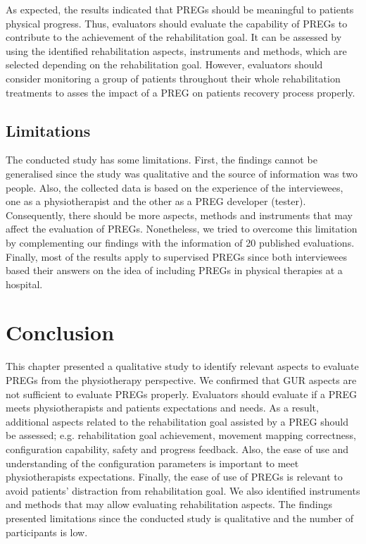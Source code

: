 As expected, the results indicated that \acp{PREG} should be meaningful to patients physical progress. Thus, evaluators should evaluate the capability of \acp{PREG} to contribute to the achievement of the rehabilitation goal. It can be assessed by using the identified rehabilitation aspects, instruments and methods, which are selected depending on the rehabilitation goal. However, evaluators should consider monitoring a group of patients throughout their whole rehabilitation treatments to asses the impact of a \ac{PREG} on patients recovery process properly.

\subsection{Limitations}
The conducted study has some limitations. First, the findings cannot be generalised since the study was qualitative and the source of information was two people. Also, the collected data is based on the experience of the interviewees, one as a physiotherapist and the other as a \ac{PREG} developer (tester). Consequently, there should be more aspects, methods and instruments that may affect the evaluation of \acp{PREG}. Nonetheless, we tried to overcome this limitation by complementing our findings with the information of 20 published evaluations. Finally, most of the results apply to supervised \acp{PREG} since both interviewees based their answers on the idea of including \acp{PREG} in physical therapies at a hospital.


\section{Conclusion}\label{sec:conclusion_aspects} %
This chapter presented a qualitative study to identify relevant aspects to evaluate \acp{PREG} from the physiotherapy perspective. We confirmed that \ac{GUR} aspects are not sufficient to evaluate \acp{PREG} properly. Evaluators should evaluate if a \ac{PREG} meets physiotherapists and patients expectations and needs. As a result, additional aspects related to the rehabilitation goal assisted by a \ac{PREG} should be assessed; e.g. rehabilitation goal achievement, movement mapping correctness, configuration capability, safety and progress feedback. Also, the ease of use and understanding of the configuration parameters is important to meet physiotherapists expectations. Finally, the ease of use of \acp{PREG} is relevant to avoid patients' distraction from rehabilitation goal. We also identified instruments and methods that may allow evaluating rehabilitation aspects. The findings presented limitations since the conducted study is qualitative and the number of participants is low.